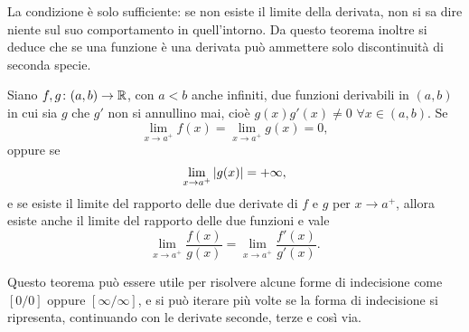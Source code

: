 La condizione è solo sufficiente: se non esiste il limite della derivata, non si sa dire niente sul suo comportamento in quell'intorno.
Da questo teorema inoltre si deduce che se una funzione è una derivata può ammettere solo discontinuità di seconda specie.
\begin{teorema}[di De l'H\^opital]
\label{t:hopital}
Siano $f,g\colon(a,b)\to\mathbb{R}$, con $a<b$ anche infiniti, due funzioni derivabili in $(a,b)$ in cui sia $g$ che $g'$ non si annullino mai, cioè $g(x)g'(x)\neq 0$ $\forall x\in(a,b)$. Se
\[
\lim_{x\to a^+}f(x)=\lim_{x\to a^+}g(x)=0,
\]
oppure se
\[
\lim_{x\to a^+}\left|{g(x)}\right|=+\infty,
\]
e se esiste il limite del rapporto delle due derivate di $f$ e $g$ per $x\to a^+$, allora esiste anche il limite del rapporto delle due funzioni e vale
\begin{equation}
\label{eq:hopital}
\lim_{x\to a^+}\frac{f(x)}{g(x)}=\lim_{x\to a^+}\frac{f'(x)}{g'(x)}.
\end{equation}
\end{teorema}
Questo teorema può essere utile per risolvere alcune forme di indecisione come $[0/0]$ oppure $[\infty /\infty]$, e si può iterare più volte se la forma di indecisione si ripresenta, continuando con le derivate seconde, terze e così via.
